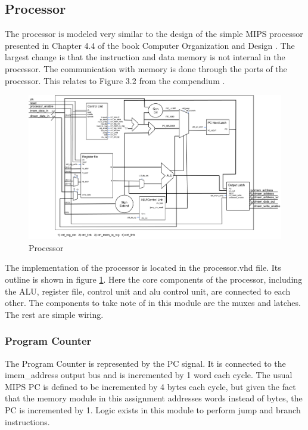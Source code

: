 \subsection{Processor}

The processor is modeled very similar to the design of the simple MIPS processor 
presented in Chapter 4.4 of the book Computer Organization and Design \cite{curriculum}. 
The largest change is that the instruction and data memory is not internal in the processor.
 The communication with memory is done through the ports of the processor. This relates to 
Figure 3.2 from the compendium \cite{compendium}. 

\begin{figure}[h]
	\centerline{\includegraphics[width=550px]{figures/processor.png}}
	\caption{Processor}
	\label{fig:processor}
\end{figure}

The implementation of the processor is located in the processor.vhd file. Its outline is 
shown in figure \ref{fig:processor}. Here the core 
components of the processor, including the ALU, register file, control unit and alu control 
unit, are connected to each other. The components to take note of in this module are 
the muxes and latches. The rest are simple wiring. 

\subsubsection{Program Counter}
The Program Counter is represented by the PC signal. It is connected to the imem\_address 
output bus and is incremented by 1 word each cycle. The usual MIPS PC is defined to be 
incremented by 4 bytes each cycle, but given the fact that the memory module in this 
assignment addresses words instead of bytes, the PC is incremented by 1. Logic exists 
in this module to perform jump and branch instructions. 

